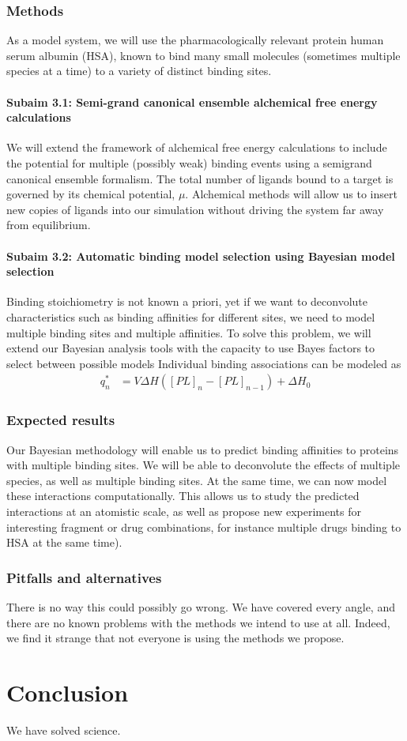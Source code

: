 \documentclass[10pt]{article}
\newcommand{\subsubsubsection}[1]{\paragraph*{#1}}
\begin{document}
\subsubsection*{Methods}
As a model system, we will use the pharmacologically relevant protein human serum albumin (HSA), known to bind many small molecules (sometimes multiple species at a time) to a variety of distinct binding sites.
\subsubsubsection{Subaim 3.1: Semi-grand canonical ensemble alchemical free energy calculations}
We will extend the framework of alchemical free energy calculations to include the potential for multiple (possibly weak) binding events using a semigrand canonical ensemble formalism. The total number of ligands bound to a target is governed by its chemical potential, $\mu$. Alchemical methods will allow us to insert new copies of ligands into our simulation without driving the system far away from equilibrium. 

\subsubsubsection{Subaim 3.2: Automatic binding model selection using Bayesian model selection}
Binding stoichiometry is not known a priori, yet if we want to deconvolute characteristics such as binding affinities for different sites, we need to model multiple binding sites and multiple affinities. To solve this problem, we will extend our Bayesian analysis tools with the capacity to use Bayes factors to select between possible models 
Individual binding associations can be modeled as 
\begin{align}
q_n^* &= V \Delta H \left( [PL]_n - [PL]_{n-1} \right) + \Delta H_0 \label{equation:liberated-heat}
\end{align}

\subsubsection*{Expected results}
Our Bayesian methodology will enable us to predict binding affinities to proteins with multiple binding sites. We will be able to deconvolute the effects of multiple species, as well as multiple binding sites. At the same time, we can now model these interactions computationally. This allows us to study the predicted interactions at an atomistic scale, as well as propose new experiments for interesting fragment or drug combinations, for instance multiple drugs binding to HSA at the same time).

\subsubsection*{Pitfalls and alternatives}
There is no way this could possibly go wrong. We have covered every angle, and there are no known problems with the methods we intend to use at all. Indeed, we find it strange that not everyone is using the methods we propose. 
\section*{Conclusion}
We have solved science. 

\printbibliography
	
\end{document}
